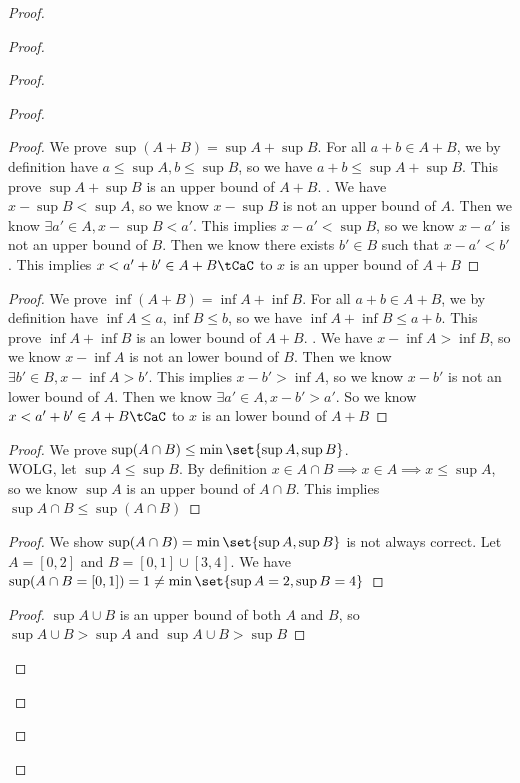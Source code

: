 \documentclass{report}
\begin{document}
\begin{proof}
\begin{proof}
\begin{proof}
\begin{proof}
\begin{question}{}{}
\begin{enumerate}
\end{enumerate}
\end{question}
\begin{proof}
We prove $\sup (A+B)=\sup A+\sup B$. For all $a+b \in A+B$, we by definition have $a\leq \sup A, b\leq \sup B$, so we have $a+b\leq \sup A+\sup B$. This prove $\sup A+\sup B$ is an upper bound of $A+B$. . We have $x-\sup B<\sup A$, so we know $x-\sup B$ is not an upper bound of $A$. Then we know  $\exists a'\in A, x-\sup B<a'$. This implies $x-a'< \sup B$, so we know $x-a'$ is not an upper bound of  $B$. Then we know there exists  $b' \in B$ such that $x-a'< b'$. This implies $x<a'+b' \in A+B\tCaC$ to $x$ is an upper bound of  $A+B$
\end{proof}
\begin{proof}
We prove $\inf (A+B)= \inf A +\inf B$. For all $a+b \in A+B$, we by definition have $\inf A\leq a,\inf B\leq b$, so we have $\inf A+\inf B\leq a+b$. This prove $\inf A+ \inf B$ is an lower bound of $A+B$.  . We have $x- \inf A > \inf B$, so we know $x - \inf A$ is not an lower bound of $B$. Then we know  $\exists b' \in B, x- \inf A > b'$. This implies $x-b'>\inf A$, so we know $x- b'$ is not an lower bound of $A$. Then we know  $\exists a' \in A, x-b'>a'$. So we know $x<a'+b' \in A+B\tCaC$ to $x$ is an lower bound of $A+B$ 
\end{proof}
\begin{proof}
We prove $\sup (A\cap B)\leq \min \set{\sup A,\sup  B}$.\\

WOLG, let $\sup A\leq \sup B$. By definition $x \in A\cap B \implies  x \in A \implies x\leq \sup A$, so we know $\sup A$ is an upper bound of $A\cap B$. This implies $\sup A\cap B\leq \sup (A\cap B)$ 
\end{proof}
\begin{proof}
We show $\sup (A\cap B)= \min \set{\sup A,\sup B}$ is not always correct. Let $A=[0,2]$ and $B=[0,1]\cup [3,4]$. We have $\sup (A\cap B= [0,1])=1\neq \min{\set{\sup A=2,\sup B=4}}$
\end{proof}
\begin{proof}
$\sup A\cup B$ is an upper bound of both $A$ and  $B$, so  $\sup A\cup B>\sup A\text{ and }\sup A\cup B>\sup B$


\end{proof}
\end{proof}
\end{proof}
\end{proof}
\end{proof}
\end{document}
